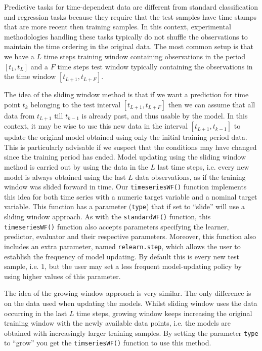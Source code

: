 \documentclass[10pt,a4paper]{article}\usepackage[]{graphicx}\usepackage[]{color}
\begin{document}
Predictive tasks for time-dependent data are different from standard
classification and regression tasks because they require that the test
samples have time stamps that are more recent then training
samples. In this context, experimental methodologies handling these
tasks typically do not shuffle the observations to maintain the time ordering
in the original data. The most common setup is that we have a $L$  time steps
training window containing observations in the period $[t_1,t_L]$ and a $F$
time steps test window typically containing the observations in the
time window $[t_{L+1},t_{L+F}]$. 

The idea of the
sliding window method is that if we want a prediction for time point
$t_k$ belonging to the test interval $[t_{L+1},t_{L+F}]$ then we can
assume that all data from $t_{L+1}$ till $t_{k-1}$ is already past,
and thus usable by the model. In this context, it may be wise to use
this new data in the interval $[t_{L+1},t_{k-1}]$ to update the
original model obtained using only the initial training period data. This is
particularly advisable if we suspect that the conditions may have
changed since the training period has ended. Model updating using the
sliding window method is carried out by using the data in the $L$ last
time steps, i.e. every new model is always obtained using the last $L$
data observations, as if the training window was slided forward in
time. Our \texttt{timeseriesWF()} function implements this idea for
both time series with a numeric target variable and a nominal target
variable. This function has a parameter (\texttt{type}) that if set to
``slide'' will use a sliding window approach. As with the
\texttt{standardWF()} function, this \texttt{timeseriesWF()} function
also accepts parameters specifying the learner, predictor, evaluator
and their respective parameters. Moreover, this function also includes
an extra parameter, named \texttt{relearn.step}, which allows the user
to establish the frequency of model updating. By default this is every
new test sample, i.e. $1$, but the user may set a less frequent
model-updating policy by using higher values of this parameter.  

The
idea of the growing window approach is very similar. The only difference
is on the data used when updating the models. Whilst sliding window
uses the data occurring in the last $L$ time steps, growing window
keeps increasing the original training window with the newly available
data points, i.e. the models are obtained with increasingly larger
training samples. By setting the parameter \texttt{type} to ``grow''
you get the \texttt{timseriesWF()} function to use this method.
\end{document}
